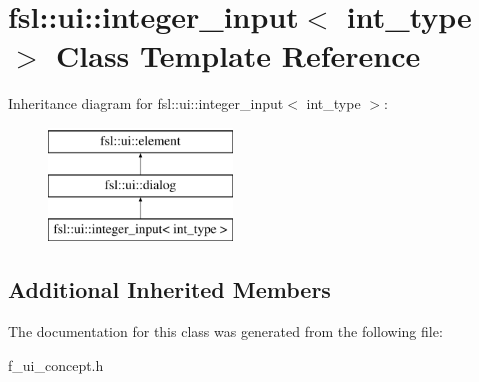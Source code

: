 \hypertarget{classfsl_1_1ui_1_1integer__input}{}\section{fsl\+::ui\+::integer\+\_\+input$<$ int\+\_\+type $>$ Class Template Reference}
\label{classfsl_1_1ui_1_1integer__input}
Inheritance diagram for fsl\+::ui\+::integer\+\_\+input$<$ int\+\_\+type $>$\+:\begin{figure}[H]
\begin{center}
\leavevmode
\includegraphics[height=3.000000cm]{classfsl_1_1ui_1_1integer__input}
\end{center}
\end{figure}
\subsection*{Additional Inherited Members}


The documentation for this class was generated from the following file\+:\begin{DoxyCompactItemize}
\item 
f\+\_\+ui\+\_\+concept.\+h\end{DoxyCompactItemize}
